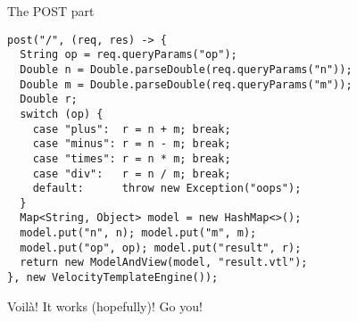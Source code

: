 \begin{frame}[fragile]{The POST part}
\begin{verbatim}
post("/", (req, res) -> {
  String op = req.queryParams("op");
  Double n = Double.parseDouble(req.queryParams("n"));
  Double m = Double.parseDouble(req.queryParams("m"));
  Double r;
  switch (op) {
    case "plus":  r = n + m; break;
    case "minus": r = n - m; break;
    case "times": r = n * m; break;
    case "div":   r = n / m; break;
    default:      throw new Exception("oops");
  }
  Map<String, Object> model = new HashMap<>();
  model.put("n", n); model.put("m", m);
  model.put("op", op); model.put("result", r);
  return new ModelAndView(model, "result.vtl");
}, new VelocityTemplateEngine());
\end{verbatim}
\end{frame}

\begin{frame}{Voilà!}
It works (hopefully)! Go you!
\end{frame}